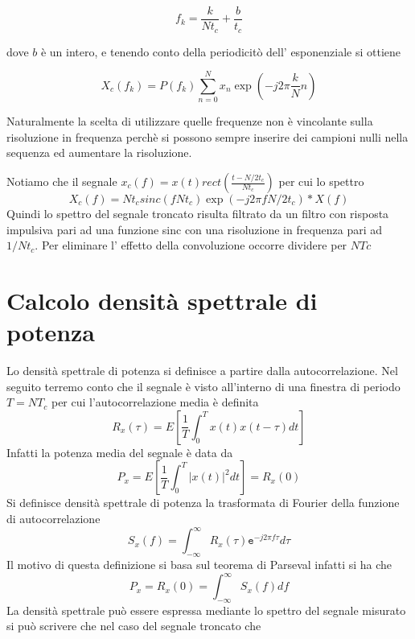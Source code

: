 \documentclass[10pt,a4paper]{book}
\begin{document}
\begin{equation}
f_k = \frac{k}{N t_c} + \frac{b}{t_c}
\end{equation}

dove $b$ è un intero, e tenendo conto della periodicitò dell' esponenziale si ottiene 

\begin{equation}
X_c(f_k) = P(f_k)\sum_{n = 0}^{N} x_n \exp \left(-j 2 \pi  \frac{k}{N} n \right)
\end{equation}

Naturalmente la scelta di utilizzare quelle frequenze non è vincolante sulla risoluzione in frequenza perchè si possono sempre inserire dei campioni nulli nella sequenza ed aumentare la risoluzione.

Notiamo che il segnale $x_c(f) = x(t) rect(\frac{t - N/2 t_c}{N t_c})$ per cui lo spettro 
\begin{equation}
X_c(f) = N t_c sinc\left(f N t_c\right) \exp \left(-j 2 \pi f N/2 t_c\right ) * X(f)
\end{equation}
Quindi lo spettro del segnale troncato risulta filtrato da un filtro con risposta impulsiva pari ad una funzione sinc con una risoluzione in frequenza pari ad $1/ N t_c$. Per eliminare l' effetto della convoluzione occorre dividere per $N Tc$

\section{Calcolo densità spettrale di potenza}
Lo densità spettrale di potenza si definisce a partire dalla  autocorrelazione. Nel seguito terremo conto che il segnale è visto all'interno di una finestra di periodo $T = N T_c$ per cui l'autocorrelazione media è definita
\begin{equation}
R_x(\tau) = E \left [ \frac{1}{ T} \int_{0}^T x(t)x(t-\tau) dt \right ] 
\end{equation}
Infatti la potenza media del segnale è data da 
\begin{equation}
P_{x} = E\left[ \frac{1}{ T} \int_{0}^T {\left|x(t)\right|}^2 dt \right ]=R_{x}(0)
\end{equation}
Si definisce densità spettrale di potenza la trasformata di Fourier della funzione di autocorrelazione
\begin{equation}
S_{x}(f) = \int_{-\infty}^{\infty}R_{x}(\tau) \mathtt{e}^ {-j 2 \pi f \tau} d\tau
\end{equation}
Il motivo di questa definizione si basa sul teorema di Parseval infatti si ha che 
\begin{equation}
P_{x} = R_{x}(0) = \int_{-\infty}^\infty S_{x}(f) df
\end{equation}
La densità spettrale può essere espressa mediante lo spettro del segnale misurato si può scrivere che nel caso del segnale troncato che 
\end{document}
